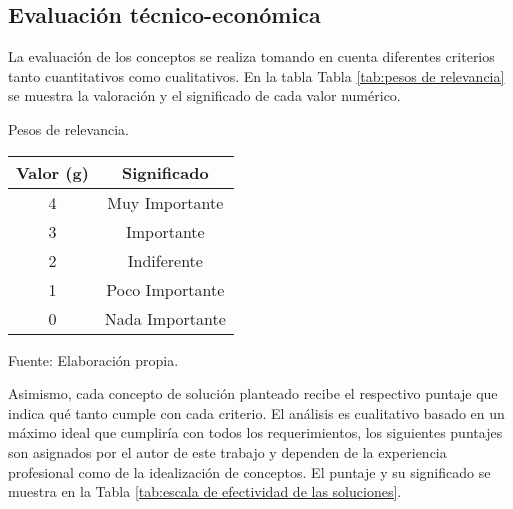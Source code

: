 
\subsection{Evaluación técnico-económica}

La evaluación de los conceptos se realiza tomando en cuenta diferentes criterios tanto cuantitativos como cualitativos. En la tabla Tabla \ref{tab:pesos de relevancia} se muestra la valoración y el significado de cada valor numérico.

\begin{mytable}[H]
	\footnotesize\centering
	\caption{Pesos de relevancia.}
	\label{tab:pesos de relevancia}
	\begin{tabular}{|c|c|}
		\hline
		\rowcolor[HTML]{D9D9D9} 
		\textbf{Valor (g)} & \textbf{Significado} \\ \hline
		4                  & Muy Importante       \\ \hline
		3                  & Importante           \\ \hline
		2                  & Indiferente          \\ \hline
		1                  & Poco Importante      \\ \hline
		0                  & Nada Importante      \\ \hline
	\end{tabular}
	\begin{myflushcenteraftertable}
		Fuente: Elaboración propia.
	\end{myflushcenteraftertable}
\end{mytable}


Asimismo, cada concepto de solución planteado recibe el respectivo puntaje que indica qué tanto cumple con cada criterio. El análisis es cualitativo basado en un máximo ideal que cumpliría con todos los requerimientos, los siguientes puntajes son asignados por el autor de este trabajo y dependen de la experiencia profesional como de la idealización de conceptos. El puntaje y su significado se muestra en la Tabla \ref{tab:escala de efectividad de las soluciones}.

